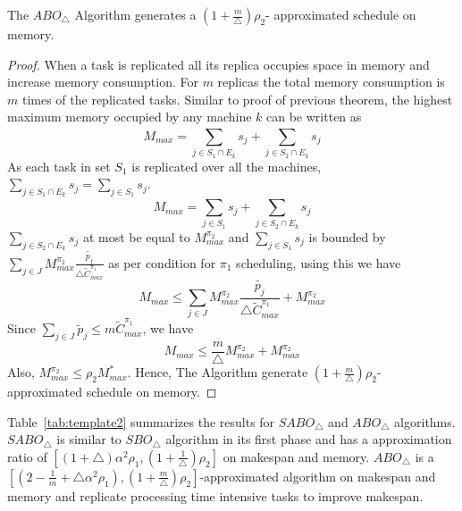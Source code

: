             \begin{theorem}
                   \label{th:chapter5-lb}
                    The $ABO_\triangle$ Algorithm generates a $ (1+\frac{m}{\triangle})\rho_2 $- approximated schedule on memory.
                   \end{theorem}
     
          \begin{proof}           
          When a task is replicated all its replica occupies space in memory and increase memory consumption. For $m$ replicas the total memory consumption is $m$ times of the replicated tasks. Similar to proof of previous theorem, the highest maximum memory occupied by any machine $k$ can be written as
           \begin{equation}\nonumber
           M_{max}= \sum_{j \in S_1\cap E_k}^{}s_j+\sum_{j \in S_2\cap E_k}^{}s_j           
        \end{equation}
        As each task in set $S_1$ is replicated over all the machines,$\sum\limits
        _{j \in S_1\cap E_k}^{}s_j =\sum\limits
        _{j \in S_1}^{}s_j$.              
            \begin{equation}\nonumber
                       M_{max} = \sum_{j\in S_1}^{}s_j+\sum_{j \in S_2\cap E_k}^{}s_j           
                    \end{equation}    
                     $\sum\limits_{j \in S_2\cap E_k}^{}s_j$  at most be equal to $M^{\pi_2}_{max} $ and $\sum\limits_{j\in S_1}s_j$ is bounded by $\sum\limits_{j \in J}^{} {M^{\pi_2}_{max}} \frac{\tilde{p_j}}{\triangle \tilde{C}^{\pi_1}_{max}} $ as per condition for  $\pi_1$ scheduling, using this we have    
 \begin{equation}\nonumber
 M_{max}\leq \sum_{j \in J}^{} {M^{\pi_2}_{max}} \frac{\tilde{p_j}}{\triangle \tilde{C}^{\pi_1}_{max}}+{M^{\pi_2}_{max}}
  \end{equation}
          Since $ \sum\limits_{j \in J}\tilde{p}_j \leq m\tilde{C}^{\pi_1}_{max} $, we have 
              \begin{equation}\nonumber
  M_{max}\leq   \frac{m}{\triangle}{M^{\pi_2}_{max}}+{M^{\pi_2}_{max}}
\end{equation}
 Also,  ${M^{\pi_2}_{max}} \leq \rho_2 {M^{*}_{max}}$.  Hence, The Algorithm generate $ (1+\frac{m}{\triangle})\rho_2 $- approximated schedule on memory.
               \end{proof}
               
               
  Table~\ref{tab:template2} summarizes the results for $SABO_\triangle$ and $ABO_\triangle$ algorithms. $SABO_\triangle$ is  similar to $ SBO_\triangle$ algorithm in its first phase and has a  approximation ratio of $[(1+\triangle)\alpha^2 \rho_1, (1+\frac{1}{\triangle})\rho_2]$ on makespan and memory.   $ABO_\triangle$ is a $ [(2-\frac{1}{m}+\triangle\alpha^2 \rho_1), (1+\frac{m}{\triangle})\rho_2] $-approximated algorithm on makespan and memory and replicate processing time intensive tasks to improve makespan.\\
  \\
  
